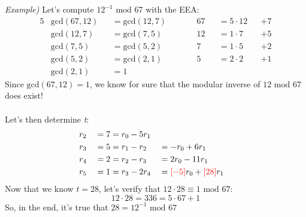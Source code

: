 \documentclass[11pt, a4paper]{article}
\newcommand{\mymod}{
    \text{ mod }
}
\begin{document}
\newpage
\hfill\break
\textit{Example)} Let's compute $12^{-1}\mymod67$ with the EEA:
\begin{alignat*}{5}
    &\text{gcd}(67,12)&&=\text{gcd}(12,7)\qquad&&67&&=5\cdot12&&+7\\
    &\text{gcd}(12,7)&&=\text{gcd}(7,5)\qquad&&12&&=1\cdot7&&+5\\
    &\text{gcd}(7,5)&&=\text{gcd}(5,2)\qquad&&7&&=1\cdot5&&+2\\
    &\text{gcd}(5,2)&&=\text{gcd}(2,1)\qquad&&5&&=2\cdot2&&+1\\
    &\text{gcd}(2,1)&&=1
\end{alignat*}
Since $\text{gcd}(67,12)=1$, we know for sure that the modular inverse of $12\mymod67$ does exist!\\\\Let's then determine \textit{t}:
\begin{alignat*}{3}
    &r_2&&=7=r_0-5r_1\\
    &r_3&&=5=r_1-r_2&&=-r_0+6r_1\\
    &r_4&&=2=r_2-r_3&&=2r_0-11r_1\\
    &r_5&&=1=r_3-2r_4&&=\textcolor{red}{[-5]}r_0+\textcolor{red}{[28]}r_1
\end{alignat*}
Now that we know $t=28$, let's verify that $12\cdot28\equiv1\mymod67$:
$$12\cdot28=336=5\cdot67+1$$
So, in the end, it's true that $28=12^{-1}\mymod67$ \checkmark
\end{document}
